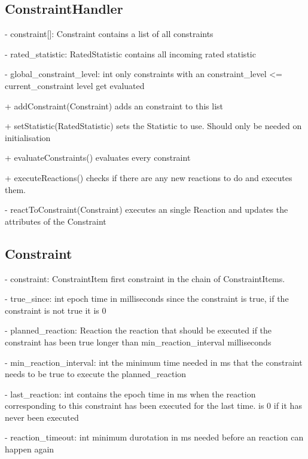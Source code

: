 
\subsection{ConstraintHandler}
	- constraint[]: Constraint
		contains a list of all constraints

	- rated\_statistic: RatedStatistic
		contains all incoming rated statistic

	- global\_constraint\_level: int
		only constraints with an constraint\_level <= current\_constraint level get evaluated


	+ addConstraint(Constraint)
		adds an constraint to this list

	+ setStatistic(RatedStatistic)
		sets the Statistic to use. Should only be needed on initialisation

	+ evaluateConstraints()
		evaluates every constraint

	+ executeReactions()
		checks if there are any new reactions to do and executes them.

	- reactToConstraint(Constraint)
		executes an single Reaction and updates the attributes of the Constraint



\subsection{Constraint}
	- constraint: ConstraintItem
		first constraint in the chain of ConstraintItems.
	
	- true\_since: int
		epoch time in milliseconds since the constraint is true,
		if the constraint is not true it is 0
	
	- planned\_reaction: Reaction
		the reaction that should be executed if the constraint has been true longer than min\_reaction\_interval milliseconds
	
	- min\_reaction\_interval: int
		the minimum time needed in ms that the constraint needs to be true to execute the planned\_reaction

	- last\_reaction: int
		contains the epoch time in ms when the reaction corresponding to this constraint has been executed for the last time.
		is 0 if it has never been executed

	- reaction\_timeout: int
		minimum durotation in ms needed before an reaction can happen again

